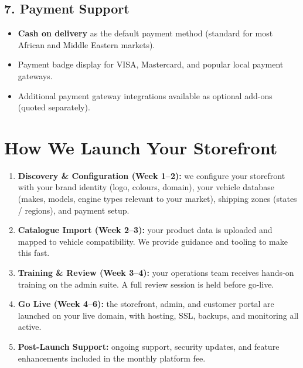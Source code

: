 \documentclass[11pt,a4paper]{article}
\begin{document}
\subsection{7. Payment Support}

\begin{itemize}[leftmargin=1.4em,itemsep=3pt]
  \item \textbf{Cash on delivery} as the default payment method
        (standard for most African and Middle Eastern markets).
  \item Payment badge display for VISA, Mastercard, and popular
        local payment gateways.
  \item Additional payment gateway integrations available as
        optional add-ons (quoted separately).
\end{itemize}

\section{How We Launch Your Storefront}

\begin{enumerate}[leftmargin=1.6em,itemsep=6pt]
  \item \textbf{Discovery \& Configuration (Week 1--2):} we
        configure your storefront with your brand identity
        (logo, colours, domain), your vehicle database (makes,
        models, engine types relevant to your market), shipping
        zones (states / regions), and payment setup.
  \item \textbf{Catalogue Import (Week 2--3):} your product data
        is uploaded and mapped to vehicle compatibility. We provide
        guidance and tooling to make this fast.
  \item \textbf{Training \& Review (Week 3--4):} your operations
        team receives hands-on training on the admin suite. A
        full review session is held before go-live.
  \item \textbf{Go Live (Week 4--6):} the storefront, admin, and
        customer portal are launched on your live domain, with
        hosting, SSL, backups, and monitoring all active.
  \item \textbf{Post-Launch Support:} ongoing support, security
        updates, and feature enhancements included in the monthly
        platform fee.
\end{enumerate}

\end{document}
